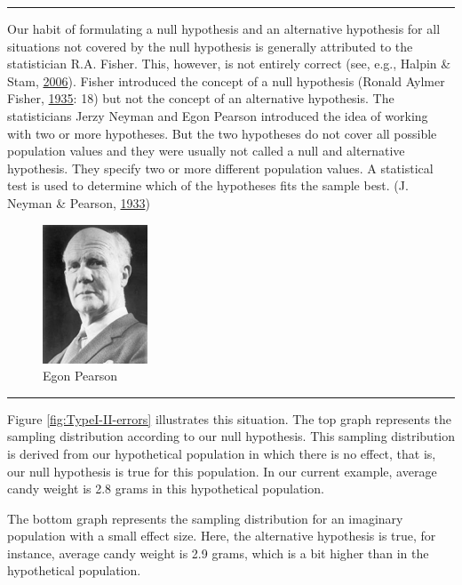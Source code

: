 \documentclass[a4paper]{book}
\theoremstyle{definition}
\theoremstyle{definition}
\theoremstyle{definition}
\theoremstyle{remark}
\begin{document}
\begin{center}\rule{0.5\linewidth}{\linethickness}\end{center}

Our habit of formulating a null hypothesis and an alternative hypothesis
for all situations not covered by the null hypothesis is generally
attributed to the statistician R.A. Fisher. This, however, is not
entirely correct (see, e.g., Halpin \& Stam,
\protect\hyperlink{ref-RefWorks:3931}{2006}). Fisher introduced the
concept of a null hypothesis (Ronald Aylmer Fisher,
\protect\hyperlink{ref-RefWorks:3932}{1935}: 18) but not the concept of
an alternative hypothesis. The statisticians Jerzy Neyman and Egon
Pearson introduced the idea of working with two or more hypotheses. But
the two hypotheses do not cover all possible population values and they
were usually not called a null and alternative hypothesis. They specify
two or more different population values. A statistical test is used to
determine which of the hypotheses fits the sample best. (J. Neyman \&
Pearson, \protect\hyperlink{ref-RefWorks:3906}{1933})

\begin{figure}[H]
\centering
\includegraphics{figures/egonpearson.png}
\caption{Egon Pearson}
\end{figure}

\begin{center}\rule{0.5\linewidth}{\linethickness}\end{center}

Figure \ref{fig:TypeI-II-errors} illustrates this situation. The top
graph represents the sampling distribution according to our null
hypothesis. This sampling distribution is derived from our hypothetical
population in which there is no effect, that is, our null hypothesis is
true for this population. In our current example, average candy weight
is 2.8 grams in this hypothetical population.

The bottom graph represents the sampling distribution for an imaginary
population with a small effect size. Here, the alternative hypothesis is
true, for instance, average candy weight is 2.9 grams, which is a bit
higher than in the hypothetical population.
\end{document}
